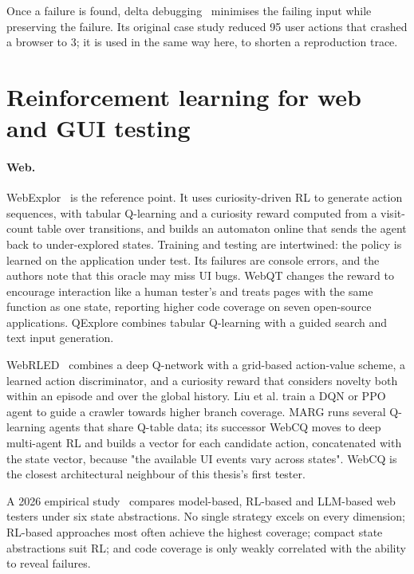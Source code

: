 Once a failure is found, delta debugging~\cite{zeller2002simplifying} minimises the failing
input while preserving the failure. Its original case study reduced 95 user actions that
crashed a browser to 3; it is used in the same way here, to shorten a reproduction trace.

\section{Reinforcement learning for web and GUI testing}
\label{sec:bg-rltesting}

\paragraph{Web.} WebExplor~\cite{zheng2021webexplor} is the reference point. It uses
curiosity-driven RL to generate action sequences, with tabular Q-learning and a curiosity
reward computed from a visit-count table over transitions, and builds an automaton online
that sends the agent back to under-explored states. Training and testing are intertwined:
the policy is learned on the application under test. Its failures are console errors, and
the authors note that this oracle may miss UI bugs. WebQT changes the
reward to encourage interaction like a human tester's and treats pages with the same
function as one state, reporting higher code coverage on seven open-source applications.
QExplore combines tabular Q-learning with a guided search and text
input generation.

WebRLED~\cite{gu2025webrled} combines a deep Q-network with a grid-based action-value
scheme, a learned action discriminator, and a curiosity reward that considers novelty both
within an episode and over the global history. Liu et al. train a DQN
or PPO agent to guide a crawler towards higher branch coverage. MARG runs
several Q-learning agents that share Q-table data; its successor
WebCQ moves to deep multi-agent RL and builds a vector for each
candidate action, concatenated with the state vector, because "the available UI events vary
across states". WebCQ is the closest architectural neighbour of this thesis's first tester.

A 2026 empirical study~\cite{liu2026webgui} compares model-based, RL-based and LLM-based
web testers under six state abstractions. No single strategy excels on every dimension;
RL-based approaches most often achieve the highest coverage; compact state abstractions suit
RL; and code coverage is only weakly correlated with the ability to reveal failures.

